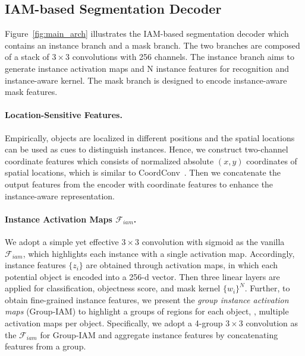 \documentclass[10pt,twocolumn,letterpaper]{article}
\begin{document}
\subsection{IAM-based Segmentation Decoder}
Figure~\ref{fig:main_arch} illustrates the IAM-based segmentation decoder which contains an instance branch and a mask branch. The two branches are composed of a stack of $3\times3$ convolutions with 256 channels. The instance branch aims to generate instance activation maps and N instance features for recognition and instance-aware kernel. The mask branch is designed to encode instance-aware mask features. 


\paragraph{Location-Sensitive Features.}
\label{sec:location_sensitive}
Empirically, objects are localized in different positions and the spatial locations can be used as cues to distinguish instances.
Hence, we construct two-channel coordinate features which consists of normalized absolute $(x,y)$ coordinates of spatial locations, which is similar to CoordConv~\cite{CoordConvLiuLMSFSY18}. Then we concatenate the output features from the encoder with coordinate features to enhance the instance-aware representation.

\paragraph{Instance Activation Maps $\mathcal{F}_{iam}$.}
We adopt a simple yet effective $3\!\times\!3$ convolution with sigmoid as the vanilla $\mathcal{F}_{iam}$, which highlights each instance with a single activation map.
Accordingly, instance features $\{z_i\}$ are obtained through activation maps, in which each potential object is encoded into a 256-d vector.
Then three linear layers are applied for classification, objectness score, and mask kernel $\{w_i\}^N$.
Further, to obtain fine-grained instance features, we present the \textit{group instance activation maps} (Group-IAM) to highlight a groups of regions for each object, \ie, multiple activation maps per object.
Specifically, we adopt a 4-group $3\!\times\!3$ convolution as the $\mathcal{F}_{iam}$ for Group-IAM and aggregate instance features by concatenating features from a group.
\end{document}
